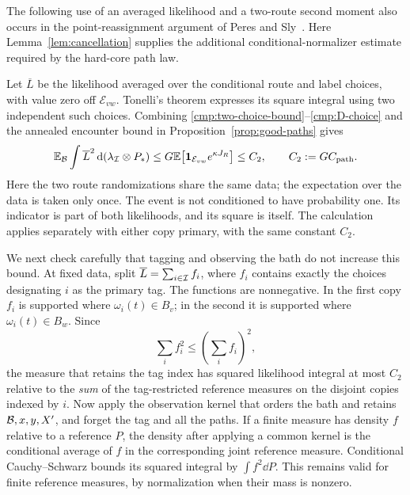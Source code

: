 The following use of an averaged likelihood and a two-route second moment
also occurs in the point-reassignment argument of
Peres and Sly~\cite[Proposition~2.1]{PeresSly2014}. Here
Lemma~\ref{lem:cancellation} supplies the additional conditional-normalizer
estimate required by the hard-core path law.

Let $\overline L$ be the likelihood averaged over the conditional route and
label choices, with value zero off $\mathcal E_{vw}$. Tonelli's theorem
expresses its square integral using two independent such choices. Combining
\eqref{cmp:two-choice-bound}--\eqref{cmp:D-choice} and the annealed encounter
bound in Proposition~\ref{prop:good-paths} gives
\begin{equation}\label{cmp:latent-second-moment}
 \mathbb E_{\mathcal B}\int\overline L^{2}
           \,\mathrm d(\lambda_{\mathcal I}\otimes P_*)
 \le G\mathbb E\bigl[\mathbf 1_{\mathcal E_{vw}}e^{\kappa J_R}\bigr]
 \le C_2,
 \qquad C_2:=G C_{\mathrm{path}}.
\end{equation}
Here the two route randomizations share the same data; the expectation over
the data is taken only once. The event is not conditioned to have probability
one. Its indicator is part of both likelihoods, and its square is itself.
The calculation applies separately with either copy primary, with the same
constant $C_2$.

We next check carefully that tagging and observing the bath do not increase
this bound. At fixed data, split $\overline L=\sum_{i\in\mathcal I}f_i$, where
$f_i$ contains exactly the choices designating $i$ as the primary tag.
The functions are nonnegative. In the first copy $f_i$ is supported where
$\omega_i(t)\in B_v$; in the second it is supported where
$\omega_i(t)\in B_w$. Since
\[
 \sum_i f_i^2\le\left(\sum_i f_i\right)^2,
\]
the measure that retains the tag index has squared likelihood integral at
most $C_2$ relative to the \emph{sum} of the tag-restricted reference
measures on the disjoint copies indexed by $i$. Now apply the observation kernel that orders the bath and retains
$\mathcal B,x,y,X'$, and forget the tag and all the paths. If a finite measure has
density $f$ relative to a reference $P$, the density after applying a common
kernel is the conditional average of $f$ in the corresponding joint
reference measure. Conditional Cauchy--Schwarz bounds its squared integral
by $\int f^2\dd P$. This remains valid for finite reference measures,
by normalization when their mass is nonzero.

